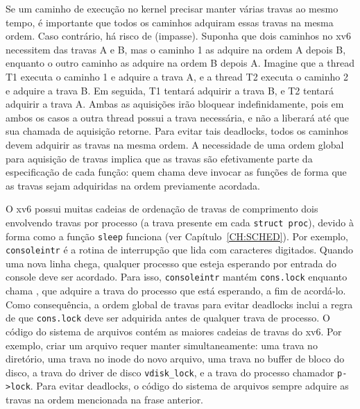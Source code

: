 Se um caminho de execução no kernel precisar manter várias travas ao mesmo tempo, é
importante que todos os caminhos adquiram essas travas na mesma ordem. Caso
contrário, há risco de  (impasse). Suponha que dois caminhos no
xv6 necessitem das travas A e B, mas o caminho 1 as adquire na ordem A
depois B, enquanto o outro caminho as adquire na ordem B depois A.
Imagine que a thread T1 executa o caminho 1 e adquire a trava A,
e a thread T2 executa o caminho 2 e adquire a trava B.
Em seguida, T1 tentará adquirir a trava B, e T2 tentará adquirir a trava A.
Ambas as aquisições irão bloquear indefinidamente, pois em ambos os casos
a outra thread possui a trava necessária, e não a liberará até que
sua chamada de aquisição retorne.
Para evitar tais deadlocks, todos os caminhos devem adquirir
as travas na mesma ordem. A necessidade de uma ordem global para aquisição
de travas implica que as travas são efetivamente parte da especificação de cada função:
quem chama deve invocar as funções de forma que as travas sejam adquiridas
na ordem previamente acordada.

O xv6 possui muitas cadeias de ordenação de travas de comprimento dois envolvendo
travas por processo
(a trava presente em cada
\lstinline{struct proc}),
devido à forma como a função
\lstinline{sleep}
funciona (ver Capítulo~\ref{CH:SCHED}).
Por exemplo,
\lstinline{consoleintr}
é a rotina de interrupção que lida com caracteres digitados.
Quando uma nova linha chega, qualquer processo que esteja esperando por
entrada do console deve ser acordado.
Para isso,
\lstinline{consoleintr}
mantém
\lstinline{cons.lock}
enquanto chama 
,
que adquire 
a trava do processo que está esperando, a fim de acordá-lo.
Como consequência, a ordem global de travas para evitar deadlocks
inclui a regra de que
\lstinline{cons.lock}
deve ser adquirida antes de qualquer trava de processo.
O código do sistema de arquivos contém as maiores cadeias de travas do xv6.
Por exemplo, criar um arquivo requer manter simultaneamente:
uma trava no diretório, uma trava no inode do novo arquivo,
uma trava no buffer de bloco do disco,
a trava do driver de disco \lstinline{vdisk_lock},
e
a trava do processo chamador \lstinline{p->lock}.
Para evitar deadlocks, o código do sistema de arquivos sempre adquire as travas na ordem
mencionada na frase anterior.

